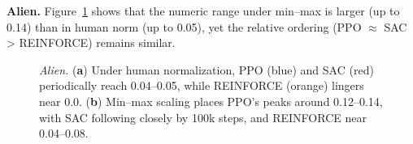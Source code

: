 \medskip

\noindent \textbf{Alien.} Figure~\ref{fig:alien_combined} shows that the numeric range under min--max is larger (up to 0.14) than in human norm (up to 0.05), yet the relative ordering (PPO $\approx$ SAC > REINFORCE) remains similar.

\begin{figure} 
	\centering
	\quad
	\caption{\emph{Alien.} 
		(\textbf{a}) Under human normalization, PPO (blue) and SAC (red) periodically reach 0.04--0.05, while REINFORCE (orange) lingers near 0.0.
		(\textbf{b}) Min--max scaling places PPO's peaks around 0.12--0.14, with SAC following closely by 100k steps, and REINFORCE near 0.04--0.08.}
	\label{fig:alien_combined}
\end{figure}

\medskip

